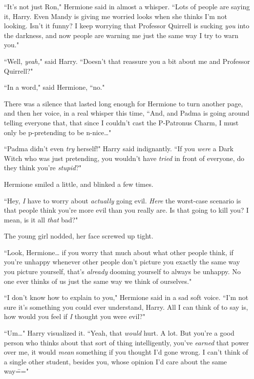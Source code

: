 ``It's not just Ron," Hermione said in almost a whisper. ``Lots of people are saying it, Harry. Even Mandy is giving me worried looks when she thinks I'm not looking. Isn't it funny? I keep worrying that Professor Quirrell is sucking \emph{you} into the darkness, and now people are warning me just the same way I try to warn you."

``Well, \emph{yeah,}" said Harry. ``Doesn't that reassure you a bit about me and Professor Quirrell?"

``In a word," said Hermione, ``no."

There was a silence that lasted long enough for Hermione to turn another page, and then her voice, in a real whisper this time, ``And, and Padma is going around telling everyone that, that since I couldn't cast the P-Patronus Charm, I must only be p-pretending to be n-nice{\ldots}"

``Padma didn't even \emph{try} herself!" Harry said indignantly. ``If you \emph{were} a Dark Witch who was just pretending, you wouldn't have \emph{tried} in front of everyone, do they think you're \emph{stupid}?"

Hermione smiled a little, and blinked a few times.

``Hey, \emph{I} have to worry about \emph{actually} going evil. \emph{Here} the worst-case scenario is that people think you're more evil than you really are. Is that going to kill you? I mean, is it all \emph{that} bad?"

The young girl nodded, her face screwed up tight.

``Look, Hermione{\ldots} if you worry that much about what other people think, if you're unhappy whenever other people don't picture you exactly the same way you picture yourself, that's \emph{already} dooming yourself to always be unhappy. No one ever thinks of us just the same way we think of ourselves."

``I don't know how to explain to you," Hermione said in a sad soft voice. ``I'm not sure it's something you could ever understand, Harry. All I can think of to say is, how would you feel if \emph{I} thought you were evil?"

``Um{\ldots}" Harry visualized it. ``Yeah, that \emph{would} hurt. A lot. But you're a good person who thinks about that sort of thing intelligently, you've \emph{earned} that power over me, it would \emph{mean} something if you thought I'd gone wrong. I can't think of a single other student, besides you, whose opinion I'd care about the same way\==="


